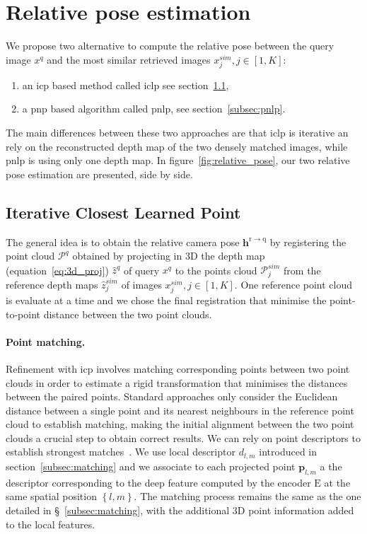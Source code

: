 \section{Relative pose estimation}
\label{sec:relative_pose}
We propose two alternative to compute the relative pose between the query image $x^q$ and the most similar retrieved images $x^{sim}_j, j \in [1, K]$:
\begin{enumerate}
	\item an \ac{icp} based method called \ac{iclp} see section~\ref{subsec:pc_alignment},
	\item a \ac{pnp} based algorithm called \ac{pnlp}, see section~\ref{subsec:pnlp}.
\end{enumerate}
\noindent The main differences between these two approaches are that \ac{iclp} is iterative an rely on the reconstructed depth map of the two densely matched images, while \ac{pnlp} is using only one depth map. In figure~\ref{fig:relative_pose}, our two relative pose estimation are presented, side by side.

\subsection{Iterative Closest Learned Point}
\label{subsec:pc_alignment}

The general idea is to obtain the relative camera pose $\mathbf{h}^\mathrm{r \rightarrow q}$ by registering the point cloud $\mathcal{P}^q$ obtained by projecting in 3D the depth map (equation~\ref{eq:3d_proj}) $\hat{z}^q$ of query $x^q$ to the points cloud $\mathcal{P}^{sim}_j$ from the reference depth maps $\hat{z}^{sim}_j$ of images $x^{sim}_j, j \in [1, K]$. One reference point cloud is evaluate at a time and we chose the final registration that minimise the point-to-point distance between the two point clouds.

\paragraph{Point matching.}
\label{para:pc_matching}
Refinement with \ac{icp} involves matching corresponding points between two point clouds in order to estimate a rigid transformation that minimises the distances between the paired points. Standard approaches only consider the Euclidean distance between a single point and its nearest neighbours in the reference point cloud to establish matching, making the initial alignment between the two point clouds a crucial step to obtain correct results. We can rely on point descriptors to establish strongest matches~\cite{Pomerleau2015}. We use local descriptor $d_{l,m}$ introduced in section~\ref{subsec:matching} and we associate to each projected point $\mathbf{p}_{l,m}$ a the descriptor corresponding to the deep feature computed by the encoder $\mathrm{E}$ at the same spatial position $\left\{l,m\right\}$. The matching process remains the same as the one detailed in \S~\ref{subsec:matching}, with the additional 3D point information added to the local features.

